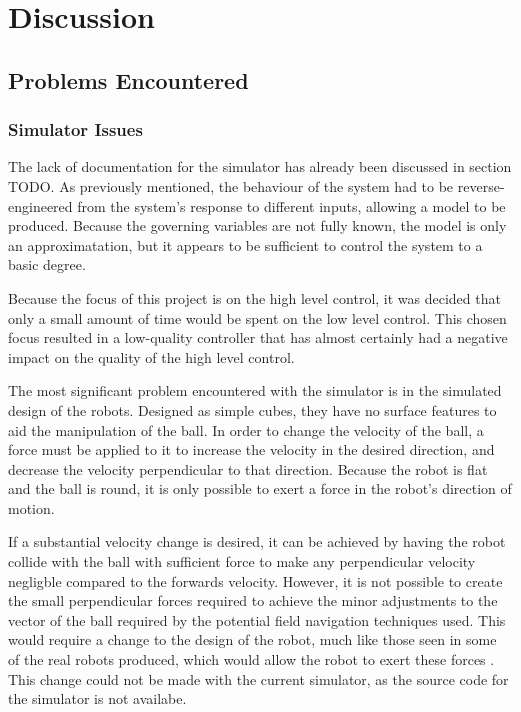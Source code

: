 \documentclass[10pt]{article} \usepackage[a4paper]{geometry}
\begin{document}
\section{Discussion}

\subsection{Problems Encountered} 

\subsubsection{Simulator Issues}

The lack of documentation for the simulator has already been discussed in
section TODO.  As previously mentioned, the behaviour of the system had to be
reverse-engineered from the system's response to different inputs, allowing a
model to be produced.  Because the governing variables are not fully known, the
model is only an approximatation, but it appears to be sufficient to control the
system to a basic degree.

Because the focus of this project is on the high level control, it was decided
that only a small amount of time would be spent on the low level control.  This
chosen focus resulted in a low-quality controller that has almost certainly had
a negative impact on the quality of the high level control.

The most significant problem encountered with the simulator is in the simulated
design of the robots.  Designed as simple cubes, they have no surface features
to aid the manipulation of the ball.  In order to change the velocity of the
ball, a force must be applied to it to increase the velocity in the desired
direction, and decrease the velocity perpendicular to that direction.  Because
the robot is flat and the ball is round, it is only possible to exert a force in
the robot's direction of motion.

If a substantial velocity change is desired, it can be achieved by having the
robot collide with the ball with sufficient force to make any perpendicular
velocity negligble compared to the forwards velocity.  However, it is not
possible to create the small perpendicular forces required to achieve the minor
adjustments to the vector of the ball required by the potential field navigation
techniques used. This would require a change to the design of the robot, much
like those seen in some of the real robots produced, which would allow the robot
to exert these forces \cite{aSuitablePaper}.  This change could not be made with
the current simulator, as the source code for the simulator is not availabe.
\end{document}
